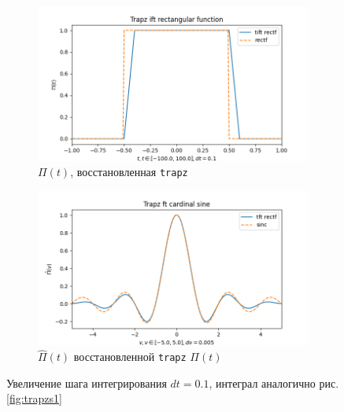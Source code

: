 \documentclass[a4paper, 12pt]{article}
\begin{document}
    \begin{figure}[H]
        \centering
        \begin{subfigure}{0.45\textwidth}
            \centering
            \includegraphics[width=\linewidth]{3_tiftr.png}
            \caption{$\Pi(t)$, восстановленная \texttt{trapz}}
            \label{fig:trectf3}
        \end{subfigure}
        \hspace{5mm}
        \begin{subfigure}{0.45\textwidth}
            \centering
            \includegraphics[width=\linewidth]{3_tftr.png}
            \caption{$\hat{\Pi}(t)$ восстановленной \texttt{trapz} $\Pi(t)$}
            \label{fig:tsinc3}
        \end{subfigure}
        \caption{Увеличение шага интегрирования $dt=0.1$, интеграл аналогично рис. \ref{fig:trapzs1}}
        \label{fig:trapzs3}
    \end{figure}
\end{document}
